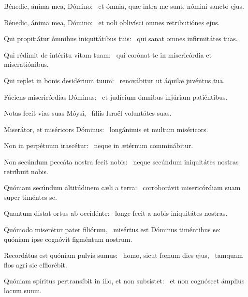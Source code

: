 \item Bénedic, ánima mea, Dómino:~\psstar{} et ómnia, quæ intra me sunt, nómini sancto ejus.

\item Bénedic, ánima mea, Dómino:~\psstar{} et noli oblivísci omnes retributiónes ejus.

\item Qui propitiátur ómnibus iniquitátibus tuis:~\psstar{} qui sanat omnes infirmitátes tuas.

\item Qui rédimit de intéritu vitam tuam:~\psstar{} qui corónat te in misericórdia et miseratiónibus.

\item Qui replet in bonis desidérium tuum:~\psstar{} renovábitur ut áquilæ juvéntus tua.

\item Fáciens misericórdias Dóminus:~\psstar{} et judícium ómnibus injúriam patiéntibus.

\item Notas fecit vias suas Móysi,~\psstar{} fíliis Israël voluntátes suas.

\item Miserátor, et miséricors Dóminus:~\psstar{} longánimis et multum miséricors.

\item Non in perpétuum irascétur:~\psstar{} neque in ætérnum comminábitur.

\item Non secúndum peccáta nostra fecit nobis:~\psstar{} neque secúndum iniquitátes nostras retríbuit nobis.

\item Quóniam secúndum altitúdinem cæli a terra:~\psstar{} corroborávit misericórdiam suam super timéntes se.

\item Quantum distat ortus ab occidénte:~\psstar{} longe fecit a nobis iniquitátes nostras.

\item Quómodo miserétur pater filiórum,~\pscross{} misértus est Dóminus timéntibus se:~\psstar{} quóniam ipse cognóvit figméntum nostrum.

\item Recordátus est quóniam pulvis sumus:~\pscross{} homo, sicut fœnum dies ejus,~\psstar{} tamquam flos agri sic efflorébit.

\item Quóniam spíritus pertransíbit in illo, et non subsístet:~\psstar{} et non cognóscet ámplius locum suum.

